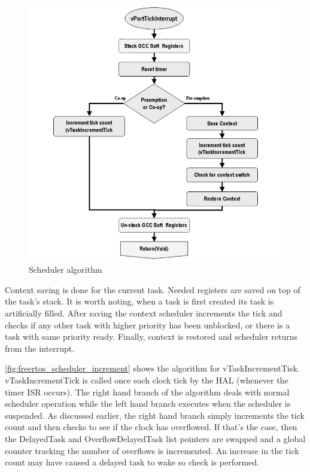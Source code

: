 \begin{figure}[H]

      \centering
      \includegraphics[width=0.8\linewidth]{images/freertos_scheduler_overview.png}
      \caption{Scheduler algorithm\citep[p~23]{freertos_inner_workings}}
      \label{fig:freertos_scheduler_overview}
    
\end{figure}

Context saving is done for the current task. Needed registers are saved on top of the task's stack. It is worth noting, when a task is first created its task is artificially filled. After saving the context scheduler increments the tick and checks if any other task with higher priority has been unblocked, or there is a task with same priority ready. Finally, context is restored and scheduler returns from the interrupt.  

\autoref{fig:freertos_scheduler_increment} shows the algorithm for vTaskIncrementTisk. vTaskIncrementTick is called once each clock tick by the HAL (whenever the timer ISR occurs). The right hand
branch of the algorithm deals with normal scheduler operation while the left hand branch
executes when the scheduler is suspended. As discussed earlier, the right hand branch
simply increments the tick count and then checks to see if the clock has overflowed. If
that’s the case, then the DelayedTask and OverflowDelayedTask list pointers are
swapped and a global counter tracking the number of overflows is incremented. An
increase in the tick count may have caused a delayed task to wake so check is performed.

